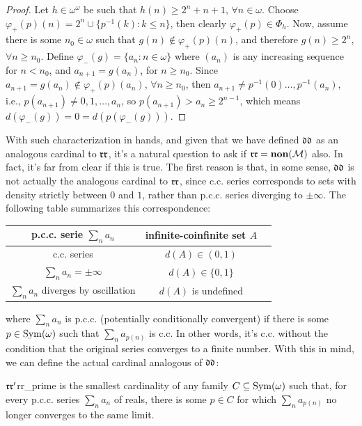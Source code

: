 \begin{proof}
    Let $h\in\omega^\omega$ be such that $h(n)\geq2^n+n+1$, $\forall n\in\omega$. Choose $\varphi_+(p)(n)=2^n\cup\{p^{-1}(k):k\leq n\}$, then clearly $\varphi_+(p)\in\Phi_h$. Now, assume there is some $n_0\in\omega$ such that $g(n)\notin\varphi_+(p)(n)$, and therefore $g(n)\geq2^n$, $\forall n\geq n_0$. Define $\varphi_-(g)=\{a_n:n\in\omega\}$ where $(a_n)$ is any increasing sequence for $n<n_0$, and $a_{n+1}=g(a_n)$, for $n\geq n_0$. Since $a_{n+1}=g(a_n)\notin\varphi_+(p)(a_n)$, $\forall n\geq n_0$, then $a_{n+1}\neq p^{-1}(0)\dots,p^{-1}(a_n)$, i.e., $p(a_{n+1})\neq0,1,\dots,a_n$, so $p(a_{n+1})>a_n\geq2^{n-1}$, which means $d(\varphi_-(g))=0=d(p(\varphi_-(g)))$.
\end{proof}

With such characterization in hands, and given that we have defined $\mathfrak{dd}$ as an analogous cardinal to $\mathfrak{rr}$, it's a natural question to ask if $\mathfrak{rr}=\textbf{non}(\mathcal{M})$ also. In fact, it's far from clear if this is true. The first reason is that, in some sense, $\mathfrak{dd}$ is not actually the analogous cardinal to $\mathfrak{rr}$, since c.c. series corresponds to sets with density strictly between $0$ and $1$, rather than p.c.c. series diverging to $\pm\infty$. The following table summarizes this correspondence:

\begin{center}
\begin{tabular}{ |c|c|c| } 
\hline
p.c.c. serie $\sum_n a_n$ & infinite-coinfinite set $A$\\
\hline
c.c. series & $d(A)\in(0,1)$ \\ 
$\sum_na_n=\pm\infty$ & $d(A)\in\{0,1\}$ \\ 
$\sum_n a_n$ diverges by oscillation & $d(A)$ is undefined\\
\hline
\end{tabular}
\end{center}

where $\sum_n a_n$ is p.c.c. (potentially conditionally convergent) if there is some $p\in\mathrm{Sym}(\omega)$ such that $\sum_na_{p(n)}$ is c.c. In other words, it's c.c. without the condition that the original series converges to a finite number. With this in mind, we can define the actual cardinal analogous of $\mathfrak{dd}$:

\begin{definition}{$\mathfrak{rr}'$}{rr_prime}
     is the smallest cardinality of any family $C\subseteq\mathrm{Sym}(\omega)$ such that, for every p.c.c. series $\sum_n a_n$ of reals, there is some $p\in C$ for which $\sum_n a_{p(n)}$ no longer converges to the same limit.
\end{definition}


